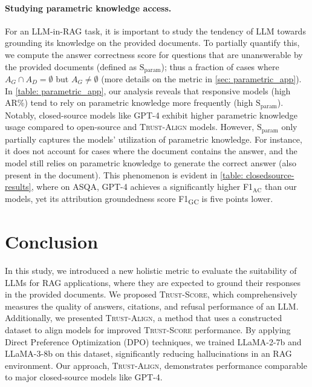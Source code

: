 \documentclass{article} %
\newcommand{\method}[0]{\textsc{Trust-Align}}
\newcommand{\metric}[0]{\textsc{Trust-Score}}
\begin{document}


\paragraph{Studying parametric knowledge access.} \label{sec: parametric}
For an LLM-in-RAG task, it is important to study the tendency of LLM towards grounding its knowledge on the provided documents. To partially quantify this, we compute the answer correctness score for questions that are unanswerable by the provided documents (defined as $\text{S}_{\text{param}}$); thus a fraction of cases where $A_G \cap A_D = \emptyset$ but $A_G \neq \emptyset$ (more details on the metric in \cref{sec: parametric_app}). In \cref{table: parametric_app}, our analysis reveals that responsive models (high AR\%) tend to rely on parametric knowledge more frequently (high $\text{S}_{\text{param}}$). Notably, closed-source models like GPT-4 exhibit higher parametric knowledge usage compared to open-source and \method{} models. However, $\text{S}_{\text{param}}$ only partially captures the models' utilization of parametric knowledge. For instance, it does not account for cases where the document contains the answer, and the model still relies on parametric knowledge to generate the correct answer (also present in the document). This phenomenon is evident in \cref{table: closedsource-results}, where on ASQA, GPT-4 achieves a significantly higher {F1$_{\text{AC}}$} than our models, yet its attribution groundedness score {F1\textsubscript{GC}} is five points lower.


\section{Conclusion}
In this study, we introduced a new holistic metric to evaluate the suitability of LLMs for RAG applications, where they are expected to ground their responses in the provided documents. We proposed \metric{}, which comprehensively measures the quality of answers, citations, and refusal performance of an LLM. Additionally, we presented \method{}, a method that uses a constructed dataset to align models for improved \metric{} performance. By applying Direct Preference Optimization (DPO) techniques, we trained LLaMA-2-7b and LLaMA-3-8b on this dataset, significantly reducing hallucinations in an RAG environment. Our approach, \method{}, demonstrates performance comparable to major closed-source models like GPT-4.
\end{document}
